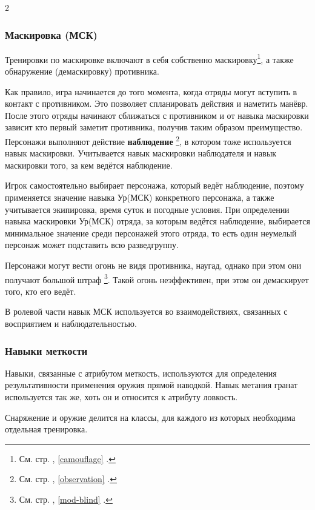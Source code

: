 \documentclass[twoside]{article}
\begin{document}
\begin{multicols}{2}
\subsubsection{Маскировка (МСК)}\label{camouflage-skill}

Тренировки по маскировке включают в себя собственно маскировку\footnote{См. стр. \pageref{camouflage}, \ref{camouflage} .},
а также обнаружение (демаскировку) противника.

Как правило, игра начинается до того момента, когда отряды могут вступить в контакт с противником. Это позволяет спланировать действия
и наметить манёвр. После этого отряды начинают сближаться с противником и от навыка маскировки зависит кто первый заметит противника,
получив таким образом преимущество. Персонажи выполняют действие \textbf{наблюдение}
\footnote{См. стр. \pageref{observation}, \ref{observation} .}, в котором тоже используется навык маскировки.
Учитывается навык маскировки наблюдателя и навык маскировки того, за кем ведётся наблюдение.

Игрок самостоятельно выбирает персонажа, который ведёт наблюдение,
поэтому применяется значение навыка Ур(МСК) конкретного персонажа, а
также учитывается экипировка, время суток и погодные условия. При
определении навыка маскировки Ур(МСК) отряда, за которым ведётся
наблюдение, выбирается минимальное значение среди персонажей этого
отряда, то есть один неумелый персонаж может подставить всю разведгруппу.

Персонажи могут вести огонь не видя противника, наугад, однако при этом они получают большой штраф
\footnote{См. стр. \pageref{mod-blind}, \ref{mod-blind} .}.
Такой огонь неэффективен, при этом он демаскирует того, кто его ведёт.

В ролевой части навык МСК используется во взаимодействиях, связанных с восприятием и наблюдательностью.

\subsubsection{Навыки меткости}\label{weapon-skills}

Навыки, связанные с атрибутом меткость, используются для определения
результативности применения оружия прямой наводкой. Навык метания гранат
используется так же, хоть он и относится к атрибуту ловкость.

Снаряжение и оружие делится на классы, для каждого из которых необходима
отдельная тренировка.


\end{multicols}
\end{document}
